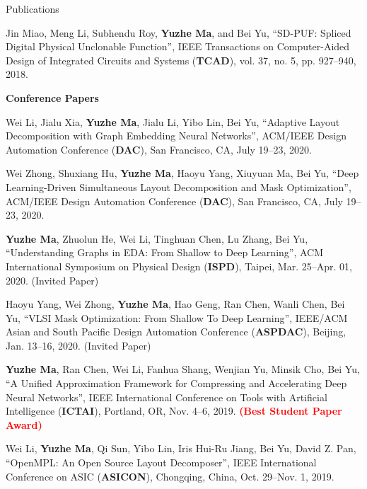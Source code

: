 \begin{rSection}{Publications}
\begin{description}[font=\normalfont]
\item[{[J1]}]{
	Jin Miao, Meng Li, Subhendu Roy, \textbf{Yuzhe Ma}, and Bei Yu, 
	``SD-PUF: Spliced Digital Physical Unclonable Function'', 
	IEEE Transactions on Computer-Aided Design of Integrated Circuits and Systems (\textbf{TCAD}), vol. 37, no. 5, pp. 927--940, 2018.
}
\end{description}


\textbf{Conference Papers}
\begin{description}[font=\normalfont]

\item[{[C13]}]{
        Wei Li, Jialu Xia, \textbf{Yuzhe Ma}, Jialu Li, Yibo Lin, Bei Yu, 
        ``Adaptive Layout Decomposition with Graph Embedding Neural Networks'', 
        ACM/IEEE Design Automation Conference (\textbf{DAC}), San Francisco, CA, July 19–23, 2020.
    }

\item[{[C12]}]{
        Wei Zhong, Shuxiang Hu, \textbf{Yuzhe Ma}, Haoyu Yang, Xiuyuan Ma, Bei Yu, 
        ``Deep Learning-Driven Simultaneous Layout Decomposition and Mask Optimization'', 
        ACM/IEEE Design Automation Conference (\textbf{DAC}), San Francisco, CA, July 19–23, 2020.
    }

\item[{[C11]}]{
        \textbf{Yuzhe Ma}, Zhuolun He, Wei Li, Tinghuan Chen, Lu Zhang, Bei Yu, 
        ``Understanding Graphs in EDA: From Shallow to Deep Learning'', 
        ACM International Symposium on Physical Design (\textbf{ISPD}), Taipei, Mar. 25–Apr. 01, 2020. (Invited Paper)
    }

\item[{[C10]}]{
        Haoyu Yang, Wei Zhong, \textbf{Yuzhe Ma}, Hao Geng, Ran Chen, Wanli Chen, Bei Yu, 
        ``VLSI Mask Optimization: From Shallow To Deep Learning'',
        IEEE/ACM Asian and South Pacific Design Automation Conference (\textbf{ASPDAC}), Beijing, Jan. 13--16, 2020. (Invited Paper)
}

\item[{[C9]}]{
   \textbf{Yuzhe Ma}, Ran Chen, Wei Li, Fanhua Shang, Wenjian Yu, Minsik Cho, Bei Yu,
        ``A Unified Approximation Framework for Compressing and Accelerating Deep Neural Networks'', 
        IEEE International Conference on Tools with Artificial Intelligence (\textbf{ICTAI}), Portland, OR, Nov. 4--6, 2019.
        \textcolor{red}{\textbf{(Best Student Paper Award)}}
}

\item[{[C8]}]{
        Wei Li, \textbf{Yuzhe Ma}, Qi Sun, Yibo Lin, Iris Hui-Ru Jiang, Bei Yu, David Z. Pan, 
        ``OpenMPL: An Open Source Layout Decomposer'', 
        IEEE International Conference on ASIC (\textbf{ASICON}), Chongqing, China, Oct. 29--Nov. 1, 2019.
}


\end{description}
\end{rSection}
